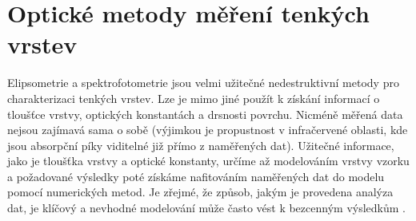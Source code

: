 \documentclass[12pt,oneside,final]{fithesis2}
\begin{document}
\chapter{Optické metody měření tenkých vrstev}
Elipsometrie a spektrofotometrie jsou velmi užitečné nedestruktivní metody pro charakterizaci tenkých vrstev. Lze je mimo jiné použít k získání informací o tloušťce vrstvy, optických konstantách a drsnosti povrchu. Nicméně měřená data nejsou zajímavá sama o sobě (výjimkou je propustnost v infračervené oblasti, kde jsou absorpční píky viditelné již přímo z naměřených dat). Užitečné informace, jako je tloušťka vrstvy a optické konstanty, určíme až modelováním vrstvy vzorku a požadované výsledky poté získáme nafitováním naměřených dat do modelu pomocí numerických metod. Je zřejmé, že způsob, jakým je provedena analýza dat, je klíčový a nevhodné modelování může často vést k bezcenným výsledkům \cite{tompkins}.
\end{document}
